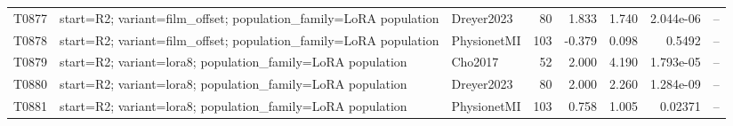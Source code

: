 \begin{longtable}{p{.45in}p{2.6in}p{.75in}rrrrr}
T0877 & start=R2; variant=film\_\allowbreak{}offset; population\_\allowbreak{}family=LoRA population & Dreyer2023 & 80 & 1.833 & 1.740 & 2.044e-06 & -- \\
T0878 & start=R2; variant=film\_\allowbreak{}offset; population\_\allowbreak{}family=LoRA population & PhysionetMI & 103 & -0.379 & 0.098 & 0.5492 & -- \\
T0879 & start=R2; variant=lora8; population\_\allowbreak{}family=LoRA population & Cho2017 & 52 & 2.000 & 4.190 & 1.793e-05 & -- \\
T0880 & start=R2; variant=lora8; population\_\allowbreak{}family=LoRA population & Dreyer2023 & 80 & 2.000 & 2.260 & 1.284e-09 & -- \\
T0881 & start=R2; variant=lora8; population\_\allowbreak{}family=LoRA population & PhysionetMI & 103 & 0.758 & 1.005 & 0.02371 & -- \\
\bottomrule
\end{longtable}

